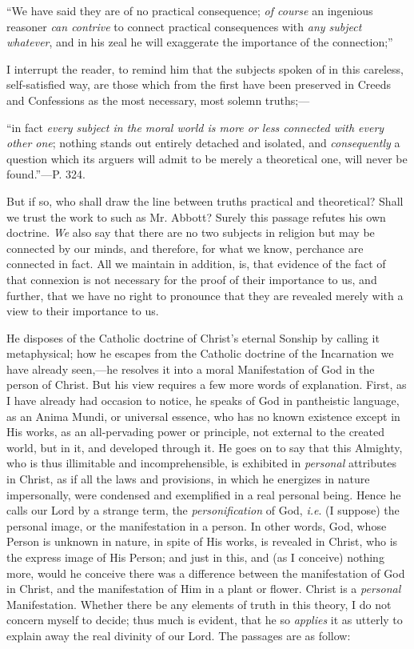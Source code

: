 ``We have said
they are of no practical consequence; \emph{of course} an ingenious
reasoner \emph{can contrive} to connect practical consequences with \emph{any
subject whatever}, and in his zeal he will exaggerate the
importance of the connection;''

I interrupt the reader, to remind him that the
subjects spoken of in this careless, self-satisfied way, are those
which from the first have been preserved in Creeds and Confessions as
the most necessary, most solemn truths;—

``in fact \emph{every
subject in the moral world is more or less connected with every other
one}; nothing stands out entirely detached and isolated, and \emph{consequently}
a question which its arguers will admit to be merely a theoretical
one, will never be found.''—P. 324.

But if so, who shall draw the line between truths
practical and theoretical? Shall we trust the work to such as Mr.
Abbott? Surely this passage refutes his own doctrine. \emph{We} also
say that there are no two subjects in religion but may be connected by
our minds, and therefore, for what we know, perchance are connected in
fact. All we maintain in addition, is, that evidence of the fact of
that connexion is not necessary for the proof of their importance to
us, and further, that we have no right to pronounce that they are
revealed merely with a view to their importance to us.

He disposes of the Catholic doctrine of
Christ's eternal Sonship by calling it metaphysical; how he escapes
from the Catholic doctrine of the Incarnation we have already
seen,—he resolves it into a moral Manifestation of God in the person
of Christ. But his view requires a few more words of explanation.
First, as I have already had occasion to notice, he speaks of God in
pantheistic language, as an Anima Mundi, or universal essence, who has
no known existence except in His works, as an all-pervading power or
principle, not external to the created world, but in it, and developed
through it. He goes on to say that this Almighty, who is thus
illimitable and incomprehensible, is exhibited in \emph{personal}
attributes in Christ, as if all the laws and provisions, in which he
energizes in nature impersonally, were condensed and exemplified in a
real personal being. Hence he calls our Lord by a strange term, the \emph{personification}
of God, \emph{i.e}. (I suppose) the personal image, or the
manifestation in a person. In other words, God, whose Person is
unknown in nature, in spite of His works, is revealed in Christ, who
is the express image of His Person; and just in this, and (as I
conceive) nothing more, would he conceive there was a difference
between the manifestation of God in Christ, and the manifestation
of Him in a plant or flower. Christ is a \emph{personal}
Manifestation. Whether there be any elements of truth in this theory,
I do not concern myself to decide; thus much is evident, that he so \emph{applies}
it as utterly to explain away the real divinity of our Lord. The
passages are as follow:

